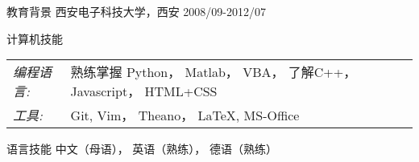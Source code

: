 \documentclass{resume} %
\begin{document}
\begin{CJK*}{UTF8}{gbsn}
\begin{rSection}{教育背景}
西安电子科技大学，西安 \hfill  2008/09-2012/07\\



\end{rSection}

\begin{rSection}{计算机技能}
\begin{tabular}{l l}
{\sl 编程语言:} &熟练掌握 Python， Matlab， VBA， 了解C++， Javascript， HTML+CSS\\
{\sl 工具:} &Git, Vim， Theano， \LaTeX{}, MS-Office
\end{tabular}

\end{rSection}

\begin{rSection}{语言技能}
中文（母语）， 英语（熟练）， 德语（熟练）
\end{rSection}




% 
% 


\end{CJK*}
\end{document}
